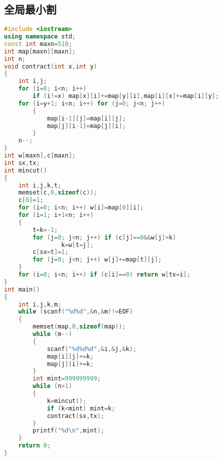 \subsection{全局最小割}
    \begin{lstlisting}[language=c++]
#include <iostream>
using namespace std;
const int maxn=510;
int map[maxn][maxn];
int n;
void contract(int x,int y)
{
    int i,j;
    for (i=0; i<n; i++)
        if (i!=x) map[x][i]+=map[y][i],map[i][x]+=map[i][y];
    for (i=y+1; i<n; i++) for (j=0; j<n; j++)
        {
            map[i-1][j]=map[i][j];
            map[j][i-1]=map[j][i];
        }
    n--;
}
int w[maxn],c[maxn];
int sx,tx;
int mincut()
{
    int i,j,k,t;
    memset(c,0,sizeof(c));
    c[0]=1;
    for (i=0; i<n; i++) w[i]=map[0][i];
    for (i=1; i+1<n; i++)
    {
        t=k=-1;
        for (j=0; j<n; j++) if (c[j]==0&&w[j]>k)
                k=w[t=j];
        c[sx=t]=1;
        for (j=0; j<n; j++) w[j]+=map[t][j];
    }
    for (i=0; i<n; i++) if (c[i]==0) return w[tx=i];
}
int main()
{
    int i,j,k,m;
    while (scanf("%d%d",&n,&m)!=EOF)
    {
        memset(map,0,sizeof(map));
        while (m--)
        {
            scanf("%d%d%d",&i,&j,&k);
            map[i][j]+=k;
            map[j][i]+=k;
        }
        int mint=999999999;
        while (n>1)
        {
            k=mincut();
            if (k<mint) mint=k;
            contract(sx,tx);
        }
        printf("%d\n",mint);
    }
    return 0;
}
    \end{lstlisting}